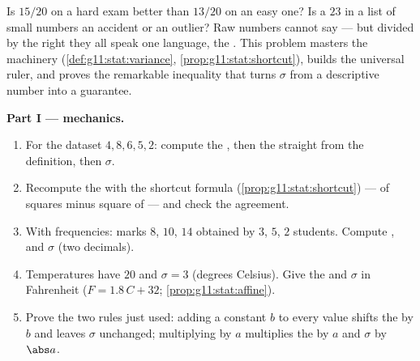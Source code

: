 \begin{problem}
\label{pb:g11:stat:1}
Is $15/20$ on a hard exam better than $13/20$ on an easy one? Is
a $23$ in a list of small numbers an accident or an outlier? Raw
numbers cannot say --- but divided by the right  they all speak one language, the \emph{}. This
problem masters the  machinery
(\cref{def:g11:stat:variance},
\cref{prop:g11:stat:shortcut}), builds the universal ruler, and
proves the remarkable inequality that turns $\sigma$ from a
descriptive number into a guarantee.

\medskip
\noindent\textbf{Part I ---  mechanics.}
\begin{enumerate}
  \item For the dataset $4, 8, 6, 5, 2$: compute the , then
        the  straight from the definition, then
        $\sigma$.
  \item Recompute the  with the shortcut formula
        (\cref{prop:g11:stat:shortcut}) ---  of squares
        minus square of  --- and check the agreement.
  \item With frequencies: marks $8$, $10$, $14$ obtained by
        $3$, $5$, $2$ students. Compute ,  and
        $\sigma$ (two decimals).
  \item Temperatures have  $20$ and $\sigma = 3$ (degrees
        Celsius). Give the  and $\sigma$ in Fahrenheit
        ($F = 1.8\,C + 32$; \cref{prop:g11:stat:affine}).
  \item Prove the two rules just used: adding a constant $b$ to
        every value shifts the  by $b$ and leaves $\sigma$
        unchanged; multiplying by $a$ multiplies the  by $a$
        and $\sigma$ by $\abs a$.
\end{enumerate}


\end{problem}

